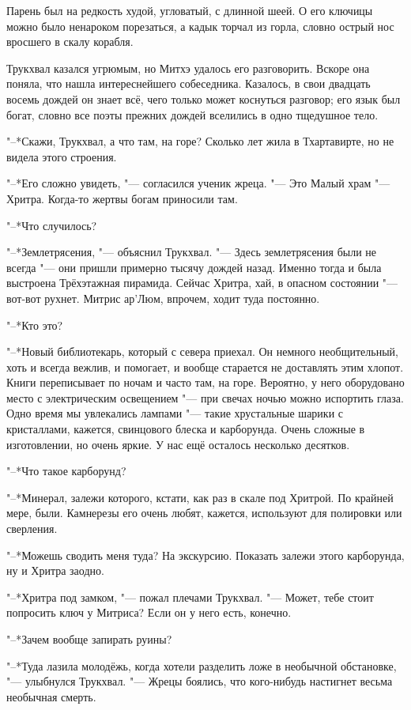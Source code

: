 \documentclass[a4paper,10pt]{book}
\begin{document}
Парень был на редкость худой, угловатый, с длинной шеей. О его ключицы можно было ненароком порезаться, а кадык торчал из горла, словно острый нос вросшего в скалу корабля.

Трукхвал казался угрюмым, но Митхэ удалось его разговорить. Вскоре она поняла, 
что нашла интереснейшего собеседника. Казалось, в свои двадцать восемь дождей 
он 
знает всё, чего только может 
коснуться разговор; его язык был богат, словно все поэты прежних дождей 
вселились в одно тщедушное тело.

"--*Скажи, Трукхвал, а что там, на горе? Сколько лет жила в Тхартавирте, но не 
видела
этого строения.

"--*Его сложно увидеть, "--- согласился ученик жреца. "--- Это Малый храм "--- 
Хритра. Когда-то жертвы богам приносили там.

"--*Что случилось?

"--*Землетрясения, "--- объяснил Трукхвал. "--- Здесь землетрясения были не 
всегда "--- они пришли примерно тысячу дождей назад. Именно тогда и была 
выстроена Трёхэтажная пирамида. Сейчас Хритра, хай, в опасном состоянии "--- 
вот-вот рухнет. Митрис ар'Люм, впрочем, ходит туда постоянно.

"--*Кто это?

"--*Новый библиотекарь, который с севера приехал. Он немного необщительный, 
хоть и всегда вежлив, и помогает, и вообще старается не доставлять этим хлопот. 
Книги переписывает по ночам и часто там, на горе. Вероятно, у него оборудовано 
место с электрическим освещением "--- при свечах ночью можно испортить глаза. 
Одно время мы увлекались лампами "--- такие хрустальные шарики с кристаллами, 
кажется, свинцового блеска и карборунда. Очень сложные в изготовлении, но очень 
яркие. У нас ещё осталось несколько десятков.

"--*Что такое карборунд?

"--*Минерал, залежи которого, кстати, как раз в скале под Хритрой. По крайней 
мере, были. Камнерезы его очень любят, кажется, используют для полировки или
сверления.

"--*Можешь сводить меня туда? На экскурсию. Показать залежи этого карборунда,
ну и Хритра заодно.

"--*Хритра под замком, "--- пожал плечами Трукхвал. "--- Может, тебе стоит 
попросить ключ у Митриса? Если он у него есть, конечно.

"--*Зачем вообще запирать руины?

"--*Туда лазила молодёжь, когда хотели разделить ложе в необычной обстановке, 
"--- улыбнулся Трукхвал.
"--- Жрецы боялись, что кого-нибудь настигнет весьма необычная смерть.
\end{document}
